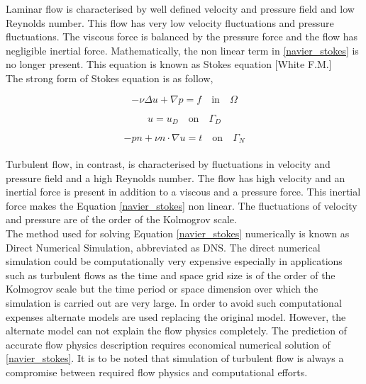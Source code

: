 \documentclass[a4paper]{book}
\begin{document}
Laminar flow is characterised by well defined velocity and pressure field and low Reynolds number. This flow has very low velocity fluctuations and pressure fluctuations. The viscous force is balanced by the pressure force and the flow has negligible inertial force. Mathematically, the non linear term in \eqref{navier_stokes} is no longer present. This equation is known as Stokes equation [White F.M.\cite{white}]\\

The strong form of Stokes equation is as follow,

\begin{equation} \label{stokes_strong_form}
-\nu \Delta u + \nabla p = f \quad \textrm{in} \quad \Omega
\end{equation}

\begin{equation} \label{dirichlet condition stokes}
u = u_D \quad \textrm{on} \quad \Gamma_D
\end{equation}

\begin{equation} \label{neumann condition stokes}
-pn + \nu n \cdot \nabla u = t \quad \textrm{on} \quad \Gamma_N
\end{equation}
\\

Turbulent flow, in contrast, is characterised by fluctuations in velocity and pressure field and a high Reynolds number. The flow has high velocity and an inertial force is present in addition to a viscous and a pressure force. This inertial force makes the Equation \eqref{navier_stokes} non linear. The fluctuations of velocity and pressure are of the order of the Kolmogrov scale.\\

The method used for solving Equation \eqref{navier_stokes} numerically is known as Direct Numerical Simulation, abbreviated as DNS. The direct numerical simulation could be computationally very expensive especially in applications such as turbulent flows as the time and space grid size is of the order of the Kolmogrov scale but the time period or space dimension over which the simulation is carried out are very large. In order to avoid such computational expenses alternate models are used replacing the original model. However, the alternate model can not explain the flow physics completely. The prediction of accurate flow physics description requires economical numerical solution of \eqref{navier_stokes}. It is to be noted that simulation of turbulent flow is always a compromise between required flow physics and computational efforts.
\end{document}
